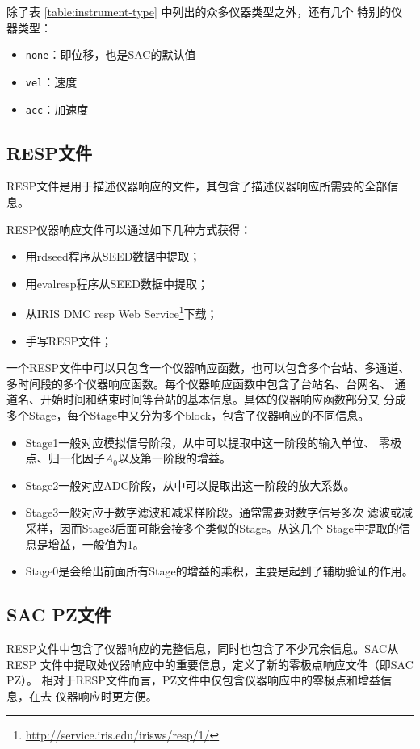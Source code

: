 除了表 \ref{table:instrument-type} 中列出的众多仪器类型之外，还有几个
特别的仪器类型：
\begin{itemize}
\item \texttt{none}：即位移，也是SAC的默认值
\item \texttt{vel}：速度
\item \texttt{acc}：加速度
\end{itemize}

\subsection{RESP文件}
RESP文件是用于描述仪器响应的文件，其包含了描述仪器响应所需要的全部信息。

RESP仪器响应文件可以通过如下几种方式获得：
\begin{itemize}
\item 用rdseed程序从SEED数据中提取；
\item 用evalresp程序从SEED数据中提取；
\item 从IRIS DMC resp Web Service\footnote{\url{http://service.iris.edu/irisws/resp/1/}}下载；
\item 手写RESP文件；
\end{itemize}

一个RESP文件中可以只包含一个仪器响应函数，也可以包含多个台站、多通道、
多时间段的多个仪器响应函数。每个仪器响应函数中包含了台站名、台网名、
通道名、开始时间和结束时间等台站的基本信息。具体的仪器响应函数部分又
分成多个Stage，每个Stage中又分为多个block，包含了仪器响应的不同信息。

\begin{itemize}
\item Stage1一般对应模拟信号阶段，从中可以提取中这一阶段的输入单位、
    零极点、归一化因子$A_0$以及第一阶段的增益。
\item Stage2一般对应ADC阶段，从中可以提取出这一阶段的放大系数。
\item Stage3一般对应于数字滤波和减采样阶段。通常需要对数字信号多次
    滤波或减采样，因而Stage3后面可能会接多个类似的Stage。从这几个
    Stage中提取的信息是增益，一般值为1。
\item Stage0是会给出前面所有Stage的增益的乘积，主要是起到了辅助验证的作用。
\end{itemize}

\subsection{SAC PZ文件}
RESP文件中包含了仪器响应的完整信息，同时也包含了不少冗余信息。SAC从RESP
文件中提取处仪器响应中的重要信息，定义了新的零极点响应文件（即SAC PZ）。
相对于RESP文件而言，PZ文件中仅包含仪器响应中的零极点和增益信息，在去
仪器响应时更方便。

